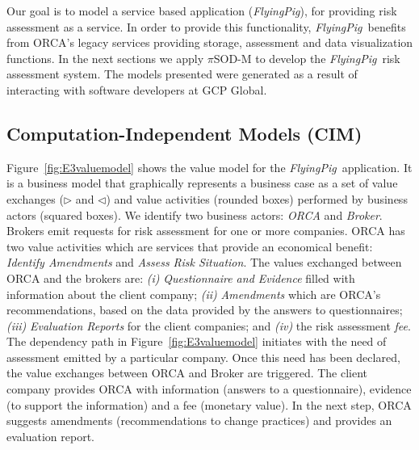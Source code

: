 \documentclass{singlecol-new}
\theoremstyle{TH}{
\newtheorem{lemma}{Lemma}
\newtheorem{theorem}[lemma]{Theorem}
\newtheorem{corrolary}[lemma]{Corrolary}
\newtheorem{conjecture}[lemma]{Conjecture}
\newtheorem{proposition}[lemma]{Proposition}
\newtheorem{claim}[lemma]{Claim}
\newtheorem{stheorem}[lemma]{Wrong Theorem}
\newtheorem{algorithm}{Algorithm}
}
\theoremstyle{THrm}{
\newtheorem{definition}{Definition}[section]
\newtheorem{question}{Question}[section]
\newtheorem{remark}{Remark}
\newtheorem{scheme}{Scheme}
}
\theoremstyle{THhit}{
\newtheorem{case}{Case}[section]
}
\theoremstyle{THhsl}{
\newtheorem{example}{Example}
}
\newcommand{\pisodm}[0]{$\pi$SOD-M\xspace}
\def\FlyingPig{\textsl{FlyingPig}\xspace}
\begin{document}
Our goal is to model a service based application (\FlyingPig), for providing risk assessment as a service.
In order to provide this functionality, \FlyingPig\ benefits from ORCA's legacy services providing storage, assessment and data visualization functions.
%
In the next sections we apply \pisodm to develop the \FlyingPig\ risk assessment system.
The models presented were generated as a result of interacting with software developers at GCP Global.



\subsection{Computation-Independent Models (CIM)}

Figure~\ref{fig:E3valuemodel} shows the value model for the \FlyingPig\ application.
It is a business model that graphically represents a business case as a set of value exchanges ($\triangleright$ and $\triangleleft$) and value activities (rounded boxes) performed by business actors (squared boxes).
We identify two business actors: \textsl{ORCA} and \textsl{Broker}.
Brokers emit requests for risk assessment for one or more companies.
ORCA has two value activities which are services that provide an economical benefit:  \textsl{Identify Amendments} and \textsl{Assess Risk Situation}.
The values exchanged between ORCA and the brokers are:
\textit{(i)} \textsl{Questionnaire and Evidence} filled with information about the client company;
\textit{(ii)} \textsl{Amendments} which are ORCA's rec\-om\-men\-da\-tions, based on the data provided by the answers to questionnaires;
\textit{(iii)} \textsl{Evaluation Reports} for the client companies;
and
\textit{(iv)} the risk assessment \textsl{fee}.
%
The dependency path in Figure~\ref{fig:E3valuemodel} initiates with the need of assessment emitted by a particular company.
Once this need has been declared, the value exchanges between ORCA and Broker are triggered.
The client company provides ORCA with information (answers to a questionnaire), evidence (to support the information) and a fee (monetary value).
In the next step, ORCA suggests amendments (recommendations to change practices) and provides an evaluation report.
\end{document}
